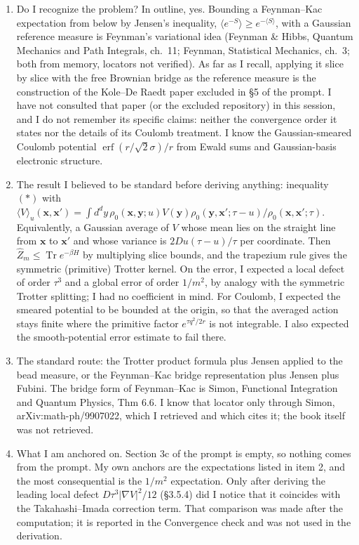 \documentclass[11pt,a4paper]{article}
\begin{document}
\begin{enumerate}
\def\labelenumi{\arabic{enumi}.}
\item
  Do I recognize the problem? In outline, yes. Bounding a Feynman--Kac expectation from below by Jensen's inequality, \(\langle e^{-S}\rangle \ge e^{-\langle S\rangle}\), with a Gaussian reference measure is Feynman's variational idea (Feynman \& Hibbs, Quantum Mechanics and Path Integrals, ch.~11; Feynman, Statistical Mechanics, ch.~3; both from memory, locators not verified). As far as I recall, applying it slice by slice with the free Brownian bridge as the reference measure is the construction of the Kole--De Raedt paper excluded in §5 of the prompt. I have not consulted that paper (or the excluded repository) in this session, and I do not remember its specific claims: neither the convergence order it states nor the details of its Coulomb treatment. I know the Gaussian-smeared Coulomb potential \(\operatorname{erf}(r/\sqrt2\sigma)/r\) from Ewald sums and Gaussian-basis electronic structure.
\item
  The result I believed to be standard before deriving anything: inequality \((\ast)\) with \(\langle V\rangle_u(\mathbf x,\mathbf x') = \int d^dy\,\rho_0(\mathbf x,\mathbf y;u)V(\mathbf y)\rho_0(\mathbf y,\mathbf x';\tau-u)/\rho_0(\mathbf x,\mathbf x';\tau)\). Equivalently, a Gaussian average of \(V\) whose mean lies on the straight line from \(\mathbf x\) to \(\mathbf x'\) and whose variance is \(2Du(\tau-u)/\tau\) per coordinate. Then \(\hat Z_m\le \operatorname{Tr}e^{-\beta H}\) by multiplying slice bounds, and the trapezium rule gives the symmetric (primitive) Trotter kernel. On the error, I expected a local defect of order \(\tau^3\) and a global error of order \(1/m^2\), by analogy with the symmetric Trotter splitting; I had no coefficient in mind. For Coulomb, I expected the smeared potential to be bounded at the origin, so that the averaged action stays finite where the primitive factor \(e^{\tau q^2/2r}\) is not integrable. I also expected the smooth-potential error estimate to fail there.
\item
  The standard route: the Trotter product formula plus Jensen applied to the bead measure, or the Feynman--Kac bridge representation plus Jensen plus Fubini. The bridge form of Feynman--Kac is Simon, Functional Integration and Quantum Physics, Thm 6.6. I know that locator only through Simon, arXiv:math-ph/9907022, which I retrieved and which cites it; the book itself was not retrieved.
\item
  What I am anchored on. Section 3c of the prompt is empty, so nothing comes from the prompt. My own anchors are the expectations listed in item 2, and the most consequential is the \(1/m^2\) expectation. Only after deriving the leading local defect \(D\tau^3|\nabla V|^2/12\) (§3.5.4) did I notice that it coincides with the Takahashi--Imada correction term. That comparison was made after the computation; it is reported in the Convergence check and was not used in the derivation.
\end{enumerate}
\end{document}

